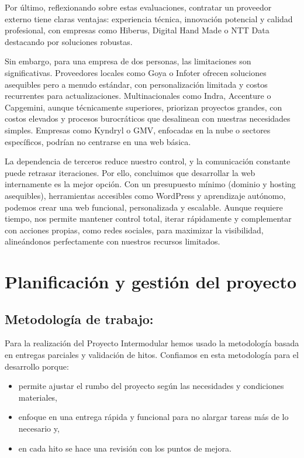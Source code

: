 \documentclass[11.5pt]{article}
\begin{document}
	Por último, reflexionando sobre estas evaluaciones, contratar un proveedor externo tiene claras ventajas:
	experiencia técnica, innovación potencial y calidad profesional, con empresas como Hiberus, Digital Hand
	Made o NTT Data destacando por soluciones robustas.
	
	Sin embargo, para una empresa de dos personas, las limitaciones son significativas. Proveedores locales
	como Goya o Infoter ofrecen soluciones asequibles pero a menudo estándar, con personalización limitada y
	costos recurrentes para actualizaciones. Multinacionales como Indra, Accenture o Capgemini, aunque
	técnicamente superiores, priorizan proyectos grandes, con costos elevados y procesos burocráticos que
	desalinean con nuestras necesidades simples. Empresas como Kyndryl o GMV, enfocadas en la nube o
	sectores específicos, podrían no centrarse en una web básica.
	
	La dependencia de terceros reduce nuestro control, y la comunicación constante puede retrasar iteraciones.
	Por ello, concluimos que desarrollar la web internamente es la mejor opción. Con un presupuesto mínimo
	(dominio y hosting asequibles), herramientas accesibles como WordPress y aprendizaje autónomo, podemos
	crear una web funcional, personalizada y escalable. Aunque requiere tiempo, nos permite mantener control
	total, iterar rápidamente y complementar con acciones propias, como redes sociales, para maximizar la
	visibilidad, alineándonos perfectamente con nuestros recursos limitados.
	
	\section{Planificación y gestión del proyecto}
	
	\subsection{Metodología de trabajo:}
	
	Para la realización del Proyecto Intermodular hemos usado la metodología basada en entregas parciales y
	validación de hitos.
	Confiamos en esta metodología para el desarrollo porque:
	\begin{itemize}
		\item permite ajustar el rumbo del proyecto según las necesidades y condiciones materiales,
		\item 	enfoque en una entrega rápida y funcional para no alargar tareas más de lo necesario y,
		\item 	en cada hito se hace una revisión con los puntos de mejora.
	\end{itemize}
	
\end{document}
